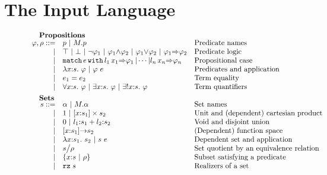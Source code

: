 
\section{The Input Language}
\label{sec:input-language}

\iflong
\begin{figure}
	\[
	\begin{array}{rl@{\quad}l}
		\noalign{\textbf{Propositions}}
		\ip,\ipp ::= 
		    & \iP \ibar \iselect{\im}{\iP}&\mbox{Predicate names}\\
		  | & \itrue \ | \ \ifalse \ibar \inot{\ip_1} \ibar {\ip_1}{\land}{\ip_2} \ibar 
		       {\ip_1}{\lor}{\ip_2}\ | \ {\ip_1}{\Rightarrow}{\ip_2} & \mbox{Predicate logic}\\
                  | & \ipcases{\ie}{\il_1}{\ix_1}{\ip_1}{\il_n}{\ix_n}{\ip_n} & \mbox{Propositional case}\\
		  | & \ilambda{\ix}{\is}{\ip}  \ibar \iapp{\ip}{\ie} & \mbox{Predicates and application}\\
		  | & \iequal{\ie_1}{\ie_2} & \mbox{Term equality}\\
		  | & \iforall{\ix}{\is}{\ip}  \ibar 
		      \iexists{\ix}{\is}{\ip} \ |\
		      \iunique{\ix}{\is}{\ip} & \mbox{Term quantifiers}\\[5pt]
		
		\noalign{\textbf{Sets}}
		\is ::= 
		    & \iS  \ibar \iselect{\im}{\iS} &\mbox{Set names}\\
		  | & \isunit \ibar \iprod{\ix}{\is_1}{\is_2}
                  &\mbox{Unit and (dependent) cartesian product}\\
		  | & \isvoid \ibar \isum{\il_1}{\is_1}{\il_2}{\is_2} &\mbox{Void and disjoint union}\\
		  | & \idarrow{\ix}{\is_1}{\is_2} & \mbox{(Dependent) function space} \\
		  | & \ilambda{\ix}{\is_1}{\is_2} \ibar 
		      \iapp{\is}{\ie} &\mbox{Dependent set and application}\\
		  | & \iquot{\is}{\ipp} & \mbox{Set quotient by an equivalence relation}\\
		  | & \isubset{\ix}{\is}{\ipp} & \mbox{Subset satisfying a predicate}\\
		  | & \irz{\is}&\mbox{Realizers of a set}\\[5pt] 
		

\end{array}\]
\end{figure}
